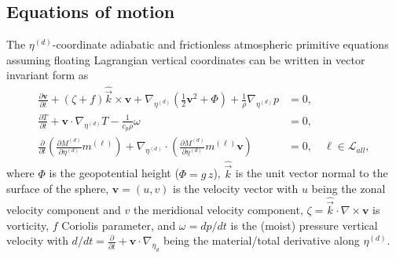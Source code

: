 \documentclass{agujournal}
\begin{document}
{\subsection{Equations of motion}\label{eq:eqnsmotion}
The $\eta^{(d)}$-coordinate adiabatic and frictionless atmospheric primitive equations assuming floating Lagrangian vertical coordinates \citep{S1945JAS,L2004MWR} can be written in vector invariant form as
\begin{align}
\frac{\partial \mathbf{v}}{\partial t} + \left( \zeta + f \right) {\hat{\vec{k}}} \times \mathbf{v}  + \nabla_{\eta^{(d)}} \left( \frac12 \mathbf{v}^2 + \Phi \right)  + \frac{1}{\rho} \nabla_{\eta^{(d)}} p &= 0,\label{E:PEmom} \\
\frac{\partial T}{\partial t} + \mathbf{v} \cdot \nabla_{\eta^{(d)}} T  -  \frac{1}{c_p \rho} \omega  &= 0, \label{E:PEtemp} \\
\frac{\partial}{\partial t} \left( \frac{\partial M^{(d)}}{\partial \eta^{(d)}} m^{(\ell)} \right) +  \nabla_{\eta^{(d)}}\cdot   \left( \frac{\partial M^{(d)}}{\partial \eta^{(d)}} m^{(\ell)} \mathbf{v} \right)  &= 0, \quad \ell \in \mathcal{L}_{all}, \label{E:PEq}
\end{align}
where $\Phi$ is the geopotential height ($\Phi=g\, z$), ${\hat{\vec{k}}}$ is the unit vector normal to the surface of the sphere, $\mathbf{v}=(u,v)$ is the velocity vector with $u$ being the zonal velocity component and $v$ the meridional velocity component, $\zeta = {\hat{\vec{k}}} \cdot {\nabla \times} \mathbf{v}$ is vorticity, $f$ Coriolis parameter, and $\omega = dp/dt$ is the (moist) pressure vertical velocity with $d/dt=\frac{\partial }{\partial t}+\mathbf{v}\cdot \nabla_{\eta_d}$ being the material/total derivative along $\eta^{(d)}$. 

}
\end{document}
